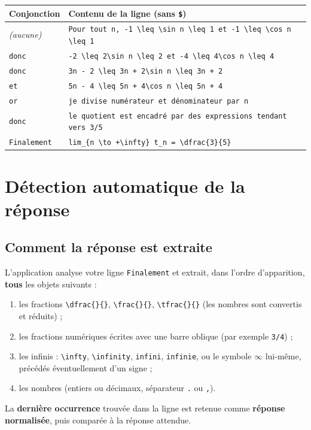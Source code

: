 \documentclass[11pt,a4paper]{article}
\begin{document}
\begin{center}
\footnotesize
\renewcommand{\arraystretch}{1.3}
\begin{tabular}{@{}p{2.4cm}p{11.8cm}@{}}
\toprule
\textbf{Conjonction} & \textbf{Contenu de la ligne (sans \texttt{\$})} \\
\midrule
\emph{(aucune)} & \verb|Pour tout n, -1 \leq \sin n \leq 1 et -1 \leq \cos n \leq 1| \\
\texttt{donc}   & \verb|-2 \leq 2\sin n \leq 2 et -4 \leq 4\cos n \leq 4| \\
\texttt{donc}   & \verb|3n - 2 \leq 3n + 2\sin n \leq 3n + 2| \\
\texttt{et}     & \verb|5n - 4 \leq 5n + 4\cos n \leq 5n + 4| \\
\texttt{or}     & \verb|je divise numérateur et dénominateur par n| \\
\texttt{donc}   & \verb|le quotient est encadré par des expressions tendant vers 3/5| \\
\texttt{Finalement} & \verb|lim_{n \to +\infty} t_n = \dfrac{3}{5}| \\
\bottomrule
\end{tabular}
\end{center}

\section{Détection automatique de la réponse}
\label{sec:detection}

\subsection{Comment la réponse est extraite}

L'application analyse votre ligne \texttt{Finalement} et extrait, dans l'ordre
d'apparition, \textbf{tous} les objets suivants :
\begin{enumerate}
  \item les fractions \verb|\dfrac{}{}|, \verb|\frac{}{}|, \verb|\tfrac{}{}|
        (les nombres sont convertis et réduits) ;
  \item les fractions numériques écrites avec une barre oblique
        (par exemple \verb|3/4|) ;
  \item les infinis : \verb|\infty|, \verb|\infinity|, \verb|infini|,
        \verb|infinie|, ou le symbole \(\infty\) lui-même, précédés
        éventuellement d'un signe ;
  \item les nombres (entiers ou décimaux, séparateur \texttt{.} ou \texttt{,}).
\end{enumerate}
La \textbf{dernière occurrence} trouvée dans la ligne est retenue comme
\textbf{réponse normalisée}, puis comparée à la réponse attendue.
\end{document}
